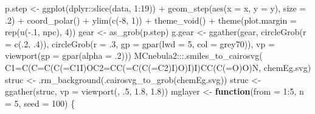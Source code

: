 \documentclass[
]{article}
\newenvironment{Shaded}{\begin{snugshade}}{\end{snugshade}}
\newcommand{\AttributeTok}[1]{\textcolor[rgb]{0.77,0.63,0.00}{#1}}
\newcommand{\ControlFlowTok}[1]{\textcolor[rgb]{0.13,0.29,0.53}{\textbf{#1}}}
\newcommand{\DecValTok}[1]{\textcolor[rgb]{0.00,0.00,0.81}{#1}}
\newcommand{\FloatTok}[1]{\textcolor[rgb]{0.00,0.00,0.81}{#1}}
\newcommand{\FunctionTok}[1]{\textcolor[rgb]{0.00,0.00,0.00}{#1}}
\newcommand{\NormalTok}[1]{#1}
\newcommand{\OtherTok}[1]{\textcolor[rgb]{0.56,0.35,0.01}{#1}}
\newcommand{\SpecialCharTok}[1]{\textcolor[rgb]{0.00,0.00,0.00}{#1}}
\newcommand{\StringTok}[1]{\textcolor[rgb]{0.31,0.60,0.02}{#1}}
\begin{document}
\begin{Shaded}
\begin{Highlighting}[]
\NormalTok{p.step }\OtherTok{\textless{}{-}} \FunctionTok{ggplot}\NormalTok{(dplyr}\SpecialCharTok{::}\FunctionTok{slice}\NormalTok{(data, }\DecValTok{1}\SpecialCharTok{:}\DecValTok{19}\NormalTok{)) }\SpecialCharTok{+}
  \FunctionTok{geom\_step}\NormalTok{(}\FunctionTok{aes}\NormalTok{(}\AttributeTok{x =}\NormalTok{ x, }\AttributeTok{y =}\NormalTok{ y), }\AttributeTok{size =}\NormalTok{ .}\DecValTok{2}\NormalTok{) }\SpecialCharTok{+}
  \FunctionTok{coord\_polar}\NormalTok{() }\SpecialCharTok{+}
  \FunctionTok{ylim}\NormalTok{(}\FunctionTok{c}\NormalTok{(}\SpecialCharTok{{-}}\DecValTok{8}\NormalTok{, }\DecValTok{1}\NormalTok{)) }\SpecialCharTok{+}
  \FunctionTok{theme\_void}\NormalTok{() }\SpecialCharTok{+}
  \FunctionTok{theme}\NormalTok{(}\AttributeTok{plot.margin =} \FunctionTok{rep}\NormalTok{(}\FunctionTok{u}\NormalTok{(}\SpecialCharTok{{-}}\NormalTok{.}\DecValTok{1}\NormalTok{, npc), }\DecValTok{4}\NormalTok{))}
\NormalTok{gear }\OtherTok{\textless{}{-}} \FunctionTok{as\_grob}\NormalTok{(p.step)}
\NormalTok{g.gear }\OtherTok{\textless{}{-}} \FunctionTok{ggather}\NormalTok{(gear,}
  \FunctionTok{circleGrob}\NormalTok{(}\AttributeTok{r =} \FunctionTok{c}\NormalTok{(.}\DecValTok{2}\NormalTok{, .}\DecValTok{4}\NormalTok{)),}
  \FunctionTok{circleGrob}\NormalTok{(}\AttributeTok{r =}\NormalTok{ .}\DecValTok{3}\NormalTok{, }\AttributeTok{gp =} \FunctionTok{gpar}\NormalTok{(}\AttributeTok{lwd =} \DecValTok{5}\NormalTok{, }\AttributeTok{col =} \StringTok{\textquotesingle{}grey70\textquotesingle{}}\NormalTok{)), }
  \AttributeTok{vp =} \FunctionTok{viewport}\NormalTok{(}\AttributeTok{gp =} \FunctionTok{gpar}\NormalTok{(}\AttributeTok{alpha =}\NormalTok{ .}\DecValTok{2}\NormalTok{)))}
\NormalTok{MCnebula2}\SpecialCharTok{:::}\FunctionTok{.smiles\_to\_cairosvg}\NormalTok{(}
  \StringTok{\textquotesingle{}C1=C(C=C(C(=C1I)OC2=CC(=C(C(=C2)I)O)I)I)CC(C(=O)O)N\textquotesingle{}}\NormalTok{,}
  \StringTok{\textquotesingle{}chemEg.svg\textquotesingle{}}\NormalTok{)}
\NormalTok{struc }\OtherTok{\textless{}{-}} \FunctionTok{.rm\_background}\NormalTok{(}\FunctionTok{.cairosvg\_to\_grob}\NormalTok{(}\StringTok{\textquotesingle{}chemEg.svg\textquotesingle{}}\NormalTok{))}
\NormalTok{struc }\OtherTok{\textless{}{-}} \FunctionTok{ggather}\NormalTok{(struc, }\AttributeTok{vp =} \FunctionTok{viewport}\NormalTok{(, .}\DecValTok{5}\NormalTok{, }\FloatTok{1.8}\NormalTok{, }\FloatTok{1.8}\NormalTok{))}
\NormalTok{mglayer }\OtherTok{\textless{}{-}} \ControlFlowTok{function}\NormalTok{(}\AttributeTok{from =} \DecValTok{1}\SpecialCharTok{:}\DecValTok{5}\NormalTok{, }\AttributeTok{n =} \DecValTok{5}\NormalTok{, }\AttributeTok{seed =} \DecValTok{100}\NormalTok{) \{}

\end{Highlighting}
\end{Shaded}
\end{document}
